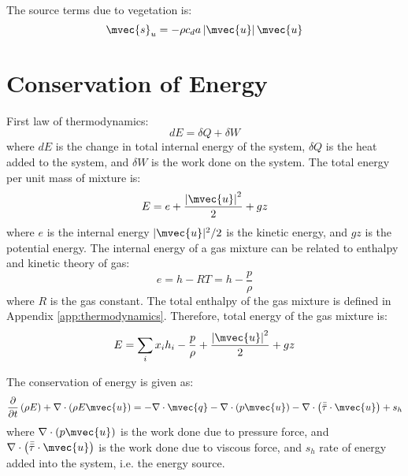 The source terms due to vegetation is:
\begin{equation}
\mvec{s}_u = - \rho c_d a \left|\mvec{u}\right| \mvec{u}
\end{equation}

\section{Conservation of Energy}

First law of thermodynamics:
\begin{equation}
dE = \delta Q + \delta W
\end{equation}
where $dE$ is the change in total internal energy of the system, $\delta Q$ is the heat added to the system, and $\delta W$ is the work done on the system. The total energy per unit mass of mixture is:
\begin{equation}
E = e + \frac{\left| \mvec{u} \right|^2}{2} + gz 
\end{equation}
where $e$ is the internal energy $|\mvec{u}|^2/2$ is the kinetic energy, and $gz$ is the potential energy. The internal energy of a gas mixture can be related to enthalpy and kinetic theory of gas:
\begin{equation}
e = h - RT = h - \frac{p}{\rho}
\end{equation}
where $R$ is the gas constant. The total enthalpy of the gas mixture is defined in Appendix \ref{app:thermodynamics}. Therefore, total energy of the gas mixture is:
\begin{equation}
E = \sum_i x_i h_i - \frac{p}{\rho} + \frac{\left| \mvec{u} \right|^2}{2} + gz
\label{eq:energysimple}
\end{equation}

The conservation of energy is given as:
\begin{equation}
\frac{\partial }{{\partial t}}\left( {{\rho }{E}} \right) + \nabla  \cdot \left( {{\rho }{E}{\mvec{u}}} \right) =  - \nabla  \cdot {\mvec{q}} - \nabla  \cdot \left( {{p}{\mvec{u}}} \right) - \nabla  \cdot \left(  \bar{\bar{{\tau}}} \cdot \mvec{u} \right) + s_h
\label{eq:energy1}
\end{equation}
where $\nabla \cdot \left(p\mvec{u}\right)$ is the work done due to pressure force, and $\nabla  \cdot \left(  \bar{\bar{{\tau}}} \cdot \mvec{u} \right)$ is the work done due to viscous force, and $s_h$ rate of energy added into the system, i.e. the energy source.


